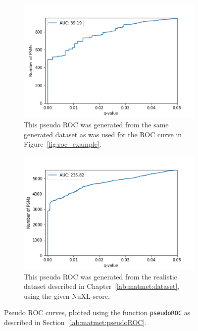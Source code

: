 	\begin{figure}
		\normalsize
		\centering
		\begin{subfigure}{0.49\textwidth}
			\includegraphics[width = \textwidth]{figures/pseudo_ROC_generated_dataset.png}
			\caption{This pseudo ROC was generated from the same generated dataset as was used for the ROC curve in Figure~\ref{fig:roc_example}.}
		\end{subfigure}
		\hfill
		\begin{subfigure}{0.49\textwidth}
			\includegraphics[width = \textwidth]{figures/pseudo_ROC_slow.png}
			\caption{This pseudo ROC was generated from the realistic dataset described in Chapter~\ref{lab:matmet:dataset}, using the given NuXL-score.}
		\end{subfigure}
		\caption[Examples of pseudo ROC curves]{Pseudo ROC curves, plotted using the function \texttt{pseudoROC} as described in Section~\ref{lab:matmet:pseudoROC}.}
		\label{fig:pseudo_roc_example}
	\end{figure}
	\renewcommand{\baselinestretch}{1}